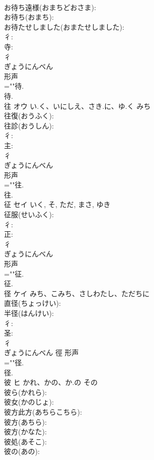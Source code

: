 \documentclass[8pt]{extreport}
\begin{document}
\begin{CJK}{UTF8}{min}
\\	お待ち遠様(おまちどおさま): 
\\	お待ち(おまち): 
\\	お待たせしました(おまたせしました): 
\\	彳: 
\\	寺: 
\\	彳	
\\	ぎょうにんべん	
\\	形声 
\\	=""待.
\\	待.
\\	往	オウ	い.く、いにしえ、さき.に、ゆ.く	みち	
\\	往復(おうふく): 
\\	往診(おうしん): 
\\	彳: 
\\	主: 
\\	彳	
\\	ぎょうにんべん	
\\	形声 
\\	=""往.
\\	往.
\\	征	セイ		いく, そ, ただ, まさ, ゆき	
\\	征服(せいふく): 
\\	彳: 
\\	正: 
\\	彳	
\\	ぎょうにんべん	
\\	形声 
\\	=""征.
\\	征.
\\	径	ケイ	みち、こみち、さしわたし、ただちに		
\\	直径(ちょっけい): 
\\	半径(はんけい): 
\\	彳: 
\\	圣: 
\\	彳	
\\	ぎょうにんべん	徑	形声 
\\	=""径.
\\	径.
\\	彼	ヒ	かれ、かの、か.の	その	
\\	彼ら(かれら): 
\\	彼女(かのじょ): 
\\	彼方此方(あちらこちら): 
\\	彼方(あちら): 
\\	彼方(かなた): 
\\	彼処(あそこ): 
\\	彼の(あの): 

\end{CJK}
\end{document}
